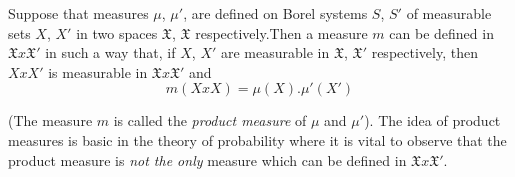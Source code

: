 \begin{theorem}\label{chap1:sec19:thm55}
Suppose that measures $\mu$, $\mu'$, are
  defined on Borel systems $S$, $S'$ of measurable sets $X$, $X'$ in two
  spaces $\mathfrak{X}$, $\mathfrak{X}$ respectively.\pageoriginale Then a measure $m$ can
  be defined in $\mathfrak{X} x \mathfrak{X}'$ in such a way that, if
  $X$, $X'$ are measurable in $\mathfrak{X}$, $\mathfrak{X}'$ respectively,
  then $X x X'$ is measurable in $\mathfrak{X} x \mathfrak{X}'$ and 
  $$
  m(X x X)=\mu(X). \mu'(X')
  $$

(The measure $m$ is called the \textit{product measure} of $\mu $ and
  $\mu '$). 
 The idea of product measures is basic in the theory of probability where
  it is vital to observe that the product measure is \textit{not the only}
  measure which can be defined in $\mathfrak{X} x \mathfrak{X}'$. 
\end{theorem}

